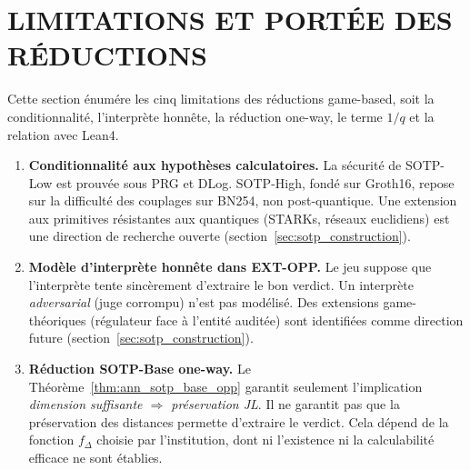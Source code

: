 \section{LIMITATIONS ET PORT\'EE DES R\'EDUCTIONS}
\label{sec:gamebased_limitations}
\begin{sloppypar}

Cette section \'enum\'ere les cinq limitations des r\'eductions game-based, soit la
conditionnalit\'e, l'interpr\`ete honn\^ete, la r\'eduction one-way, le terme $1/q$
et la relation avec Lean4.

\begin{enumerate}
\item \textbf{Conditionnalit\'e aux hypoth\`eses calculatoires.}
      La s\'ecurit\'e de SOTP-Low est prouv\'ee sous PRG et DLog.
      SOTP-High, fond\'e sur Groth16, repose sur la difficult\'e des
      couplages sur BN254, non post-quantique. Une extension aux
      primitives r\'esistantes aux quantiques (STARKs, r\'eseaux
      euclidiens) est une direction de recherche ouverte (section~\ref{sec:sotp_construction}).

\item \textbf{Mod\`ele d'interpr\`ete honn\^ete dans EXT-OPP.}
      Le jeu suppose que l'interpr\`ete tente sinc\`erement d'extraire
      le bon verdict. Un interpr\`ete \emph{adversarial} (juge
      corrompu) n'est pas mod\'elis\'e. Des extensions game-th\'eoriques
      (r\'egulateur face \`a l'entit\'e audit\'ee) sont identifi\'ees comme
      direction future (section~\ref{sec:sotp_construction}).

\item \textbf{R\'eduction SOTP-Base one-way.}
      Le Th\'eor\`eme~\ref{thm:ann_sotp_base_opp} garantit seulement l'implication
      \textit{dimension suffisante $\Rightarrow$ pr\'eservation JL}. Il ne garantit
      pas que la pr\'eservation des distances permette d'extraire le verdict.
      Cela d\'epend de la fonction $f_\Delta$ choisie par l'institution, dont ni
      l'existence ni la calculabilit\'e efficace ne sont \'etablies.


\end{enumerate}
\end{sloppypar}
